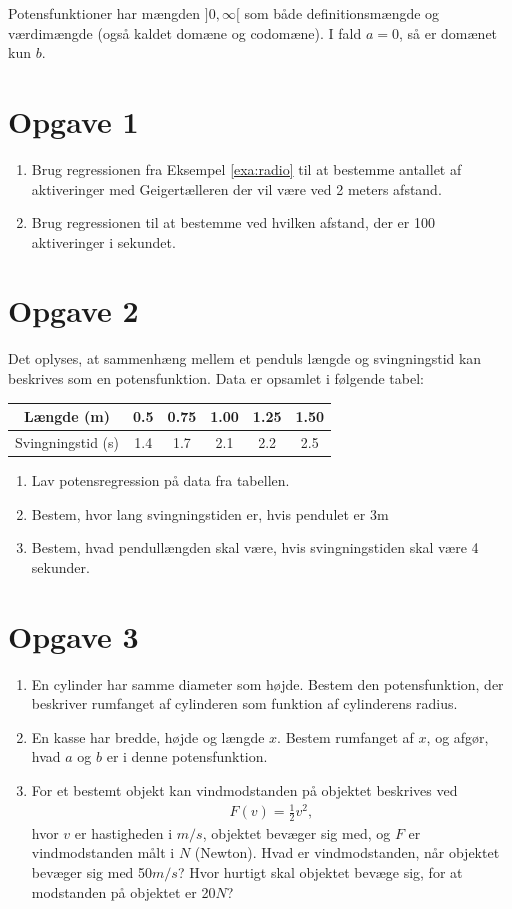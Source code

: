 Potensfunktioner har mængden $]0,\infty[$ som både definitionsmængde og værdimængde (også kaldet domæne og codomæne). I fald $a = 0$, så er domænet kun $b$. 

\section*{Opgave 1}
\begin{enumerate}[label=\roman*)]
\item Brug regressionen fra Eksempel \ref{exa:radio} til at bestemme antallet af aktiveringer med Geigertælleren der vil være ved 2 meters afstand.
\item Brug regressionen til at bestemme ved hvilken afstand, der er 100 aktiveringer i sekundet. 
\end{enumerate}
\section*{Opgave 2}
Det oplyses, at sammenhæng mellem et penduls længde og svingningstid kan beskrives som en potensfunktion. Data er opsamlet i følgende tabel:

\begin{center}\begin{tabular}{c|c|c|c|c|c}
Længde (m)& 0.5 & 0.75 & 1.00 & 1.25 & 1.50\\ \hline
Svingningstid (s) & 1.4 & 1.7 & 2.1 & 2.2 & 2.5 
\end{tabular}
\end{center}
\begin{enumerate}[label=\roman*)]
\item Lav potensregression på data fra tabellen. 
\item Bestem, hvor lang svingningstiden er, hvis pendulet er 3m
\item Bestem, hvad pendullængden skal være, hvis svingningstiden skal være 4 sekunder. 
\end{enumerate}
\section*{Opgave 3}
\begin{enumerate}[label=\roman*)]
\item En cylinder har samme diameter som højde. Bestem den potensfunktion, der beskriver rumfanget af cylinderen som funktion af cylinderens radius. 
\item En kasse har bredde, højde og længde $x$. Bestem rumfanget af $x$, og afgør, hvad $a$ og $b$ er i denne potensfunktion.
\item For et bestemt objekt kan vindmodstanden på objektet beskrives ved 
\begin{align*}
F(v)= \frac{1}{2}v^2,
\end{align*}
hvor $v$ er hastigheden i $m/s$, objektet bevæger sig med, og $F$ er vindmodstanden målt i $N$ (Newton). Hvad er vindmodstanden, når objektet bevæger sig med 50$m/s$? Hvor hurtigt skal objektet bevæge sig, for at modstanden på objektet er 20$N$?

\end{enumerate}
